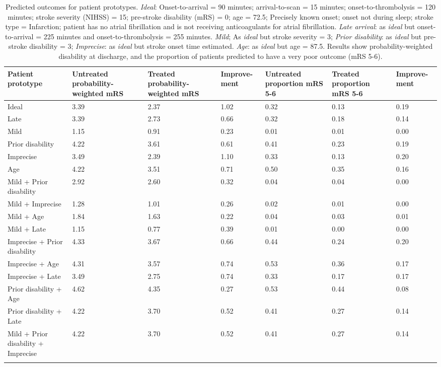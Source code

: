 \begin{minipage}{1\textwidth}
\small
\begin{longtable}{p{5.2cm} | p{1.6cm} p{1.6cm} p{1.5cm} | p{1.6cm} p{1.6cm} p{1.5cm}}
\caption{Predicted outcomes for patient prototypes. \textit{Ideal}: Onset-to-arrival = 90 minutes; arrival-to-scan = 15 minutes; onset-to-thrombolysis = 120 minutes; stroke severity (NIHSS) = 15; pre-stroke disability (mRS) = 0; age = 72.5; Precisely known onset; onset not during sleep; stroke type = Infarction; patient has no atrial fibrillation and is not receiving anticoagulants for atrial fibrillation. \textit{Late arrival}: as \textit{ideal} but onset-to-arrival = 225 minutes and onset-to-thrombolysis = 255 minutes. \textit{Mild}; As \textit{ideal} but stroke severity = 3; \textit{Prior disability}: as \textit{ideal} but pre-stroke disability = 3; \textit{Imprecise}: as \textit{ideal} but stroke onset time estimated. \textit{Age}: as \textit{ideal} but age = 87.5. Results show probability-weighted disability at discharge, and the proportion of patients predicted to have a very poor outcome (mRS 5-6).}\\
\toprule
\endhead
Patient prototype & Untreated probability-weighted mRS & Treated probability-weighted mRS & Improve-ment & Untreated proportion mRS 5-6 & Treated proportion mRS 5-6 & Improve-ment\\
\midrule
Ideal & 3.39 & 2.37 & 1.02 & 0.32 & 0.13 & 0.19\\
Late & 3.39 & 2.73 & 0.66 & 0.32 & 0.18 & 0.14\\
Mild & 1.15 & 0.91 & 0.23 & 0.01 & 0.01 & 0.00\\
Prior disability & 4.22 & 3.61 & 0.61 & 0.41 & 0.23 & 0.19\\
Imprecise & 3.49 & 2.39 & 1.10 & 0.33 & 0.13 & 0.20\\
Age & 4.22 & 3.51 & 0.71 & 0.50 & 0.35 & 0.16\\
Mild + Prior disability & 2.92 & 2.60 & 0.32 & 0.04 & 0.04 & 0.00\\
Mild + Imprecise & 1.28 & 1.01 & 0.26 & 0.02 & 0.01 & 0.00\\
Mild + Age & 1.84 & 1.63 & 0.22 & 0.04 & 0.03 & 0.01\\
Mild + Late & 1.15 & 0.77 & 0.39 & 0.01 & 0.00 & 0.00\\
Imprecise + Prior disability & 4.33 & 3.67 & 0.66 & 0.44 & 0.24 & 0.20\\
Imprecise + Age & 4.31 & 3.57 & 0.74 & 0.53 & 0.36 & 0.17\\
Imprecise + Late & 3.49 & 2.75 & 0.74 & 0.33 & 0.17 & 0.17\\
Prior disability + Age & 4.62 & 4.35 & 0.27 & 0.53 & 0.44 & 0.08\\
Prior disability + Late & 4.22 & 3.70 & 0.52 & 0.41 & 0.27 & 0.14\\
Mild + Prior disability + Imprecise & 4.22 & 3.70 & 0.52 & 0.41 & 0.27 & 0.14\\
\bottomrule
\label{tab:prototype_outcomes}
\end{longtable}
\normalsize
\end{minipage}



